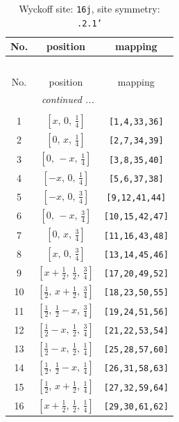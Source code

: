 \documentclass[fleqn,8pt]{jsarticle}
\begin{document}
\renewcommand{\arraystretch}{1.2}
\begin{longtable}{ccc}
\caption{Wyckoff site: {\tt 16j}, site symmetry: {\tt .2.1'}}
 \\
 \hline \hline
No. & position & mapping \\ \hline \endfirsthead

\multicolumn{2}{l}{\tablename\ \thetable{}} \\
 \hline \hline
No. & position & mapping \\ \hline \endhead

 \hline \hline
\multicolumn{2}{r}{\footnotesize\it continued ...} \\ \endfoot

 \hline \hline
\multicolumn{2}{r}{} \\ \endlastfoot

1 & $\left[ x,\, 0,\, \frac{1}{4} \right]$ & {\tt [1,4,33,36]} \\ \hline
2 & $\left[ 0,\, x,\, \frac{1}{4} \right]$ & {\tt [2,7,34,39]} \\ \hline
3 & $\left[ 0,\, - x,\, \frac{1}{4} \right]$ & {\tt [3,8,35,40]} \\ \hline
4 & $\left[ - x,\, 0,\, \frac{1}{4} \right]$ & {\tt [5,6,37,38]} \\ \hline
5 & $\left[ - x,\, 0,\, \frac{3}{4} \right]$ & {\tt [9,12,41,44]} \\ \hline
6 & $\left[ 0,\, - x,\, \frac{3}{4} \right]$ & {\tt [10,15,42,47]} \\ \hline
7 & $\left[ 0,\, x,\, \frac{3}{4} \right]$ & {\tt [11,16,43,48]} \\ \hline
8 & $\left[ x,\, 0,\, \frac{3}{4} \right]$ & {\tt [13,14,45,46]} \\ \hline
9 & $\left[ x + \frac{1}{2},\, \frac{1}{2},\, \frac{3}{4} \right]$ & {\tt [17,20,49,52]} \\ \hline
10 & $\left[ \frac{1}{2},\, x + \frac{1}{2},\, \frac{3}{4} \right]$ & {\tt [18,23,50,55]} \\ \hline
11 & $\left[ \frac{1}{2},\, \frac{1}{2} - x,\, \frac{3}{4} \right]$ & {\tt [19,24,51,56]} \\ \hline
12 & $\left[ \frac{1}{2} - x,\, \frac{1}{2},\, \frac{3}{4} \right]$ & {\tt [21,22,53,54]} \\ \hline
13 & $\left[ \frac{1}{2} - x,\, \frac{1}{2},\, \frac{1}{4} \right]$ & {\tt [25,28,57,60]} \\ \hline
14 & $\left[ \frac{1}{2},\, \frac{1}{2} - x,\, \frac{1}{4} \right]$ & {\tt [26,31,58,63]} \\ \hline
15 & $\left[ \frac{1}{2},\, x + \frac{1}{2},\, \frac{1}{4} \right]$ & {\tt [27,32,59,64]} \\ \hline
16 & $\left[ x + \frac{1}{2},\, \frac{1}{2},\, \frac{1}{4} \right]$ & {\tt [29,30,61,62]} \\
\end{longtable}
\end{document}
